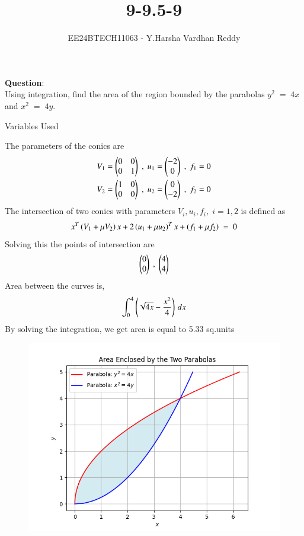 \documentclass[journal]{IEEEtran}
\begin{document}

\vspace{3cm}

\title{9-9.5-9}
\author{EE24BTECH11063 - Y.Harsha Vardhan Reddy}
{\let\newpage\relax\maketitle}

\renewcommand{\thefigure}{\theenumi}
\renewcommand{\thetable}{\theenumi}
\setlength{\intextsep}{10pt} %


\renewcommand{\thetable}{\theenumi}
\textbf{Question}:\\
Using integration, find the area of the region bounded by the parabolas $y^2\;=\;4x$ and  $x^2\;=\;4y$.
\\
\solution
\begin{table}[h!]    
  \centering
  
  \caption{Variables Used}
  \label{tab1-1.2-20}
\end{table}
The parameters of the conics are
\begin{align}
V_1=\begin{pmatrix}0 & 0 \\ 0 & 1\end{pmatrix}\;,\;u_1=\begin{pmatrix}-2\\0\end{pmatrix} \;,\;f_1=0\\
V_2=\begin{pmatrix}1 & 0 \\ 0 & 0\end{pmatrix}\;,\;u_2=\begin{pmatrix}0\\-2\end{pmatrix}\;,\;f_2=0
\end{align}
The intersection of two conics with parameters $V_i,u_i,f_i,\;i= 1,2$ is defined as
\begin{align}
x^T\left(V_1+\mu V_2\right)x+2\left(u_1+\mu u_2\right)^T x + \left(f_1+\mu f_2\right)\;=\;0
\end{align}
Solving this the points of intersection are
\begin{align}
\begin{pmatrix}0\\0\end{pmatrix}\;,\;\begin{pmatrix}4\\4\end{pmatrix}
\end{align}
Area between the curves is,
\begin{align}
\int_{0}^{4} \left(\sqrt{4x}-\frac{x^2}{4}\right) \, dx 
\end{align}
By solving the integration, we get area is equal to 5.33 sq.units
\begin{figure}[h!]
   \centering
   \includegraphics[width=\linewidth]{figs/Figure_1.png}
   \label{stemplot}
   \caption{}
\end{figure}
\end{document}
